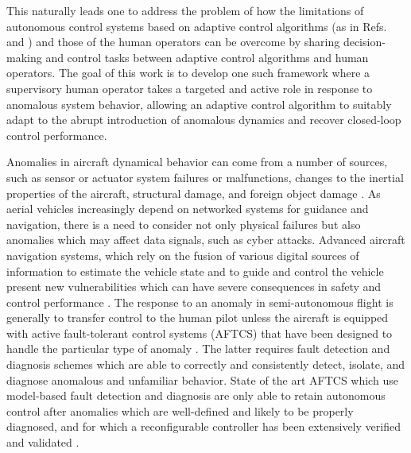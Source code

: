 This naturally leads one to address the problem of how the limitations of autonomous control systems based on adaptive control algorithms (as in Refs.~\cite{narendra2012stable} and \cite{lavretsky2013robust}) and those of the human operators can be overcome by sharing decision-making and control tasks between adaptive control algorithms and human operators. The goal of this work is to develop one such framework where a supervisory human operator takes a targeted and active role in response to anomalous system behavior, allowing an adaptive control algorithm to suitably adapt to the abrupt introduction of anomalous dynamics and recover closed-loop control performance. 

Anomalies in aircraft dynamical behavior can come from a number of sources, such as sensor or actuator system failures or malfunctions, changes to the inertial properties of the aircraft, structural damage, and foreign object damage \cite{belcastro2016aircraft}. As aerial vehicles increasingly depend on networked systems for guidance and navigation, there is a need to consider not only physical failures but also anomalies which may affect data signals, such as cyber attacks. Advanced aircraft navigation systems, which rely on the fusion of various digital sources of information to estimate the vehicle state and to guide and control the vehicle present new vulnerabilities which can have severe consequences in safety and control performance \cite{kim2012cyber, kerns2014unmanned, kwon2014analysis, amin2009safe}. The response to an anomaly in semi-autonomous flight is generally to transfer control to the human pilot unless the aircraft is equipped with active fault-tolerant control systems (AFTCS) that have been designed to handle the particular type of anomaly \cite{zhang2008bibliographical}. The latter requires fault detection and diagnosis schemes which are able to correctly and consistently detect, isolate, and diagnose anomalous and unfamiliar behavior. State of the art AFTCS which use model-based fault detection and diagnosis are only able to retain autonomous control after anomalies which are well-defined and likely to be properly diagnosed, and for which a reconfigurable controller has been extensively verified and validated \cite{zhang2008bibliographical}. 

